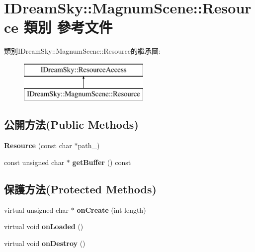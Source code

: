 \hypertarget{class_i_dream_sky_1_1_magnum_scene_1_1_resource}{}\section{I\+Dream\+Sky\+:\+:Magnum\+Scene\+:\+:Resource 類別 參考文件}
\label{class_i_dream_sky_1_1_magnum_scene_1_1_resource}
類別\+I\+Dream\+Sky\+:\+:Magnum\+Scene\+:\+:Resource的繼承圖\+:\begin{figure}[H]
\begin{center}
\leavevmode
\includegraphics[height=2.000000cm]{class_i_dream_sky_1_1_magnum_scene_1_1_resource}
\end{center}
\end{figure}
\subsection*{公開方法(Public Methods)}
\begin{DoxyCompactItemize}
\item 
{\bfseries Resource} (const char $\ast$path\+\_\+)\hypertarget{class_i_dream_sky_1_1_magnum_scene_1_1_resource_acf08499df6dc0d6a29e2ecf333b381c5}{}\label{class_i_dream_sky_1_1_magnum_scene_1_1_resource_acf08499df6dc0d6a29e2ecf333b381c5}

\item 
const unsigned char $\ast$ {\bfseries get\+Buffer} () const \hypertarget{class_i_dream_sky_1_1_magnum_scene_1_1_resource_a7b8c19567e1e98a9f839a477bf1570b7}{}\label{class_i_dream_sky_1_1_magnum_scene_1_1_resource_a7b8c19567e1e98a9f839a477bf1570b7}

\end{DoxyCompactItemize}
\subsection*{保護方法(Protected Methods)}
\begin{DoxyCompactItemize}
\item 
virtual unsigned char $\ast$ {\bfseries on\+Create} (int length)\hypertarget{class_i_dream_sky_1_1_magnum_scene_1_1_resource_ae4e1d6b9e878abada6fecd8c031a6205}{}\label{class_i_dream_sky_1_1_magnum_scene_1_1_resource_ae4e1d6b9e878abada6fecd8c031a6205}

\item 
virtual void {\bfseries on\+Loaded} ()\hypertarget{class_i_dream_sky_1_1_magnum_scene_1_1_resource_a057e384e1631ef5593deea88f00d7d5c}{}\label{class_i_dream_sky_1_1_magnum_scene_1_1_resource_a057e384e1631ef5593deea88f00d7d5c}

\item 
virtual void {\bfseries on\+Destroy} ()\hypertarget{class_i_dream_sky_1_1_magnum_scene_1_1_resource_a72d9f37f9ea18b990ffb62d2f153ed27}{}\label{class_i_dream_sky_1_1_magnum_scene_1_1_resource_a72d9f37f9ea18b990ffb62d2f153ed27}

\end{DoxyCompactItemize}
